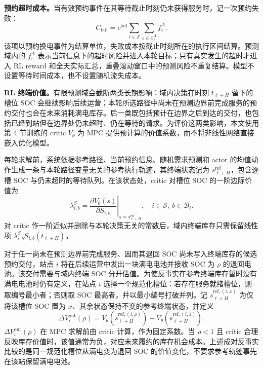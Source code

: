 \documentclass[12pt,a4paper,UTF8]{ctexart}
\begin{document}
\textbf{预约超时成本。}当有效预约事件在其等待截止时刻仍未获得服务时，记一次预约失败：
\begin{equation}
C_{\mathrm{fail}}
=
c^{\mathrm{fail}}
\sum_{i\in\mathcal S}
\sum_{\varepsilon\in\mathcal E_{i}^{A}}
f_\varepsilon^A.
\label{eq:reservation_failure_cost}
\end{equation}
该项以预约换电事件为结算单位，失败成本按截止时刻所在的执行区间结算。预测域内的 $f_\varepsilon^A$ 表示当前信息下的超时风险并进入本轮目标；只有真实发生的超时才进入 RL reward 和全天实际汇总，重叠滚动窗口中的预测风险不重复结算。模型不设置等待时间成本，也不设置随机流失成本。

\textbf{RL 终端价值。}有限预测域会截断两类长期影响：域内决策在时刻 $t_{\ell+H}$ 留下的槽位 SOC 会继续影响后续运营；本轮所选路径中尚未在预测边界前完成服务的预约交付也会在未来消耗满电库存。后一类既包括预计在边界之后到达的交付，也包括已经到站但在边界处仍未超时、仍在等待的请求。为评价这两类影响，本文使用第 4 节训练的 critic $V_\theta$ 为 MPC 提供预计算的价值系数，而不将非线性网络直接嵌入优化模型。

每轮求解前，系统依据参考路径、当前预约信息、随机需求预测和 actor 的均值动作生成一条与本轮路径变量无关的参考执行轨迹，其终端状态记为 $s_{\ell+H}^{\mathrm{ref}}$，包含逐槽 SOC 与仍未超时的等待队列。在该状态处，critic 对槽位 SOC 的一阶边际价值为
\begin{equation}
\lambda^S_{i,b}
=
\left.
\frac{\partial V_{\theta}(s)}
{\partial S_{i,b}}
\right|_{s=s_{\ell+H}^{\mathrm{ref}}},
\quad i\in\mathcal S,\ b\in\mathcal B_i.
\label{eq:marginal_value_soc}
\end{equation}
对 critic 作一阶近似并删除与本轮决策无关的常数后，域内终端库存只需保留线性项 $\lambda^S_{i,b}S_{i,b}(t_{\ell+H}^{-})$。

对于任一尚未在预测边界前完成服务、因而其退回 SOC 尚未写入终端库存的候选预约交付，站点 $i$ 将在后续运营中发出一块满电电池并接收 SOC 为 $\rho$ 的退回电池。该交付需要与域内终端 SOC 分开估值。为使反事实在参考终端库存暂时没有满电电池时仍有定义，在站点 $i$ 选择一个规范化槽位：若存在服务就绪槽位，则取编号最小者；否则取 SOC 最高者，并以最小编号打破并列。记 $s_{\ell+H}^{\mathrm{ref},(i,x)}$ 为仅将该槽位 SOC 置为 $x$、其余状态保持不变的参考终端状态，并定义
\begin{equation}
\Delta V_{i}^{\mathrm{out}}(\rho)
=
 V_\theta\!\left(s_{\ell+H}^{\mathrm{ref},(i,\rho)}\right)
-V_\theta\!\left(s_{\ell+H}^{\mathrm{ref},(i,1)}\right).
\label{eq:outside_swap_value}
\end{equation}
$\Delta V_{i}^{\mathrm{out}}(\rho)$ 在 MPC 求解前由 critic 计算，作为固定系数。当 $\rho<1$ 且 critic 合理反映库存价值时，该值通常为负，对应未来履约的库存机会成本。上述成对反事实比较的是同一规范化槽位从满电变为退回 SOC 的价值变化，不要求参考轨迹事先在该站保留满电电池。
\end{document}
